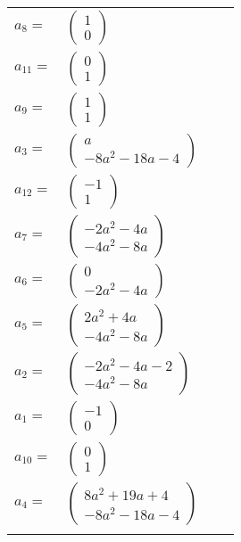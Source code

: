 \documentclass[1p]{elsarticle_modified}
\theoremstyle{definition}
\begin{document}
\begin{tabular}{m{7pt} m{180pt} m{7pt} m{180pt} }
\flushright $a_{8}=$&$\begin{pmatrix}1\\0\end{pmatrix}$ \\
\flushright $a_{11}=$&$\begin{pmatrix}0\\1\end{pmatrix}$ \\
\flushright $a_{9}=$&$\begin{pmatrix}1\\1\end{pmatrix}$ \\
\flushright $a_{3}=$&$\begin{pmatrix}a\\-8 a^2-18 a-4\end{pmatrix}$ \\
\flushright $a_{12}=$&$\begin{pmatrix}-1\\1\end{pmatrix}$ \\
\flushright $a_{7}=$&$\begin{pmatrix}-2 a^2-4 a\\-4 a^2-8 a\end{pmatrix}$ \\
\flushright $a_{6}=$&$\begin{pmatrix}0\\-2 a^2-4 a\end{pmatrix}$ \\
\flushright $a_{5}=$&$\begin{pmatrix}2 a^2+4 a\\-4 a^2-8 a\end{pmatrix}$ \\
\flushright $a_{2}=$&$\begin{pmatrix}-2 a^2-4 a-2\\-4 a^2-8 a\end{pmatrix}$ \\
\flushright $a_{1}=$&$\begin{pmatrix}-1\\0\end{pmatrix}$ \\
\flushright $a_{10}=$&$\begin{pmatrix}0\\1\end{pmatrix}$ \\
\flushright $a_{4}=$&$\begin{pmatrix}8 a^2+19 a+4\\-8 a^2-18 a-4\end{pmatrix}$\\&\end{tabular}
\end{document}
